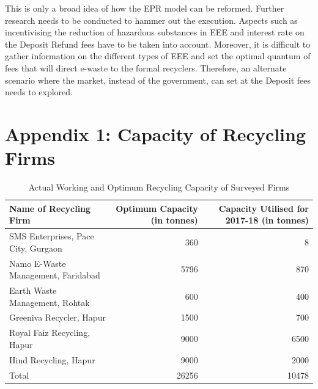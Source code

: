 \documentclass[a4paper, 12pt]{article}
\begin{document}
                    This is only a broad idea of how the EPR model can be reformed. Further research needs to be conducted to hammer out the execution. Aspects such as incentivising the reduction of hazardous substances in EEE and interest rate on the Deposit Refund fees have to be taken into account. Moreover, it is difficult to gather information on the different types of EEE and set the optimal quantum of fees that will direct e-waste to the formal recyclers. Therefore, an alternate scenario where the market, instead of the government, can set at the Deposit fees needs to explored. \\
         

	\printbibliography
         
         
             \section*{Appendix 1: Capacity of Recycling Firms}
        \begin{table}[htbp]
          \centering
          \caption{Actual Working and Optimum Recycling Capacity of Surveyed Firms}
            \begin{tabular}{lrr}
            \multicolumn{1}{p{5em}}{Name of Recycling Firm} & \multicolumn{1}{p{5em}}{Optimum Capacity (in tonnes)} & \multicolumn{1}{p{7.915em}}{Capacity Utilised for 2017-18 (in tonnes)} \\
            \midrule
            SMS Enterprises, Pace City, Gurgaon & 360   & 8 \\
            Namo E-Waste Management, Faridabad & 5796  & 870 \\
            Earth Waste Management, Rohtak & 600   & 400 \\
            Greeniva Recycler, Hapur & 1500  & 700 \\
            Royal Faiz Recycling, Hapur  & 9000  & 6500 \\
            Hind Recycling, Hapur & 9000  & 2000 \\
            \midrule
            Total & 26256 & 10478 \\
            \end{tabular}%
          \label{tab:addlabel}%
        \end{table}%
        
\end{document}
